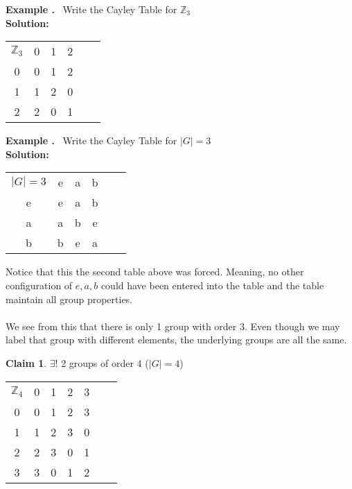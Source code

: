 \documentclass{article}
\newcounter{example}
\newcounter{claim}
\newcounter{solution}
\theoremstyle{definition}
\theoremstyle{claim}
\newtheorem{claim}{Claim}[section]
\theoremstyle{remark}
\theoremstyle{theorem}
\newcommand\Example{%
  \stepcounter{example}%
  \textbf{Example \theexample.}~%
  \setcounter{solution}{0}%
}
\newcommand\TheSolution{%
  \textbf{Solution:}\\%
}
\begin{document}
\begin{flushleft}
\Example Write the Cayley Table for $\mathbb{Z}_{3}$\\

\TheSolution 
 \begin{center}
\setlength\extrarowheight{3pt}
\begin{tabular}{c | c c c c c}
    $\mathbb{Z}_{3}$ & 0 & 1 & 2  \\
    \cline{1-4}
    0 & 0 & 1 & 2  \\
    1 & 1 & 2 & 0  \\
    2 & 2 & 0 & 1  \\
\end{tabular}
\end{center}

\Example Write the Cayley Table for $|G|=3$\\

\TheSolution 
 \begin{center}

\setlength\extrarowheight{3pt}
\begin{tabular}{c | c c c c c}
    $|G|=3$ & e & a & b  \\
    \cline{1-4}
    e & e & a & b  \\
    a & a & b & e  \\
    b & b & e & a  \\
\end{tabular}
\end{center}
Notice that this the second table above was forced. Meaning, no other configuration of $e,a,b$ could have been entered into the table and the table maintain all group properties.\\\\
We see from this that there is only 1 group with order 3. Even though we may label that group with different elements, the underlying groups are all the same.

\begin{claim}{}
$\exists$! 2 groups of order 4 ($|G|=4$)
\end{claim}

\begin{center}
\setlength\extrarowheight{3pt}
\begin{tabular}{c | c c c c c c}
    $\mathbb{Z}_{4}$ & 0 & 1 & 2 & 3  \\
    \cline{1-5}
    0 & 0 & 1 & 2 & 3  \\
    1 & 1 & 2 & 3 & 0 	\\
    2 & 2 & 3 & 0 & 1	\\
    3 & 3 & 0 & 1 & 2	\\
\end{tabular}
\end{center}


\end{flushleft}
\end{document}
